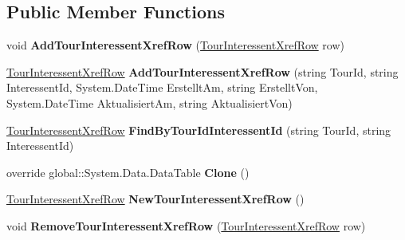 \subsection*{Public Member Functions}
\begin{DoxyCompactItemize}
\item 
void {\bfseries Add\+Tour\+Interessent\+Xref\+Row} (\hyperlink{class_products_1_1_data_1_1ds_sage_1_1_tour_interessent_xref_row}{Tour\+Interessent\+Xref\+Row} row)\hypertarget{class_products_1_1_data_1_1ds_sage_1_1_tour_interessent_xref_data_table_ac7f66f8330cc7f5277f43fd572fdb9f0}{}\label{class_products_1_1_data_1_1ds_sage_1_1_tour_interessent_xref_data_table_ac7f66f8330cc7f5277f43fd572fdb9f0}

\item 
\hyperlink{class_products_1_1_data_1_1ds_sage_1_1_tour_interessent_xref_row}{Tour\+Interessent\+Xref\+Row} {\bfseries Add\+Tour\+Interessent\+Xref\+Row} (string Tour\+Id, string Interessent\+Id, System.\+Date\+Time Erstellt\+Am, string Erstellt\+Von, System.\+Date\+Time Aktualisiert\+Am, string Aktualisiert\+Von)\hypertarget{class_products_1_1_data_1_1ds_sage_1_1_tour_interessent_xref_data_table_a659fe45f18e3e676c1d8ea7a36924b43}{}\label{class_products_1_1_data_1_1ds_sage_1_1_tour_interessent_xref_data_table_a659fe45f18e3e676c1d8ea7a36924b43}

\item 
\hyperlink{class_products_1_1_data_1_1ds_sage_1_1_tour_interessent_xref_row}{Tour\+Interessent\+Xref\+Row} {\bfseries Find\+By\+Tour\+Id\+Interessent\+Id} (string Tour\+Id, string Interessent\+Id)\hypertarget{class_products_1_1_data_1_1ds_sage_1_1_tour_interessent_xref_data_table_a1735387b9a44f609dbf2bff46d7bfd3e}{}\label{class_products_1_1_data_1_1ds_sage_1_1_tour_interessent_xref_data_table_a1735387b9a44f609dbf2bff46d7bfd3e}

\item 
override global\+::\+System.\+Data.\+Data\+Table {\bfseries Clone} ()\hypertarget{class_products_1_1_data_1_1ds_sage_1_1_tour_interessent_xref_data_table_adeef058e1d6c00771713a438573c90f9}{}\label{class_products_1_1_data_1_1ds_sage_1_1_tour_interessent_xref_data_table_adeef058e1d6c00771713a438573c90f9}

\item 
\hyperlink{class_products_1_1_data_1_1ds_sage_1_1_tour_interessent_xref_row}{Tour\+Interessent\+Xref\+Row} {\bfseries New\+Tour\+Interessent\+Xref\+Row} ()\hypertarget{class_products_1_1_data_1_1ds_sage_1_1_tour_interessent_xref_data_table_a38b90692e9434c8ab261f788c7a32e37}{}\label{class_products_1_1_data_1_1ds_sage_1_1_tour_interessent_xref_data_table_a38b90692e9434c8ab261f788c7a32e37}

\item 
void {\bfseries Remove\+Tour\+Interessent\+Xref\+Row} (\hyperlink{class_products_1_1_data_1_1ds_sage_1_1_tour_interessent_xref_row}{Tour\+Interessent\+Xref\+Row} row)\hypertarget{class_products_1_1_data_1_1ds_sage_1_1_tour_interessent_xref_data_table_aa5fcd82ded16215813cab3132595bade}{}\label{class_products_1_1_data_1_1ds_sage_1_1_tour_interessent_xref_data_table_aa5fcd82ded16215813cab3132595bade}

\end{DoxyCompactItemize}
